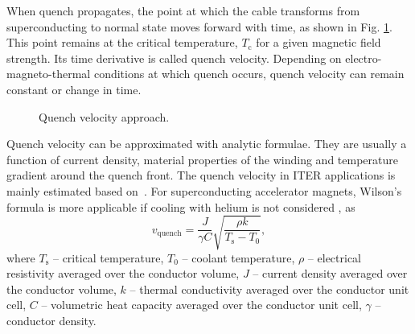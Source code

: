 
When quench propagates, the point at which the cable transforms from superconducting to normal state moves forward with time, as shown in Fig. \ref{fig:quench_front_propagation_illustration}. This point remains at the critical temperature, $T_\text{c}$ for a given magnetic field strength. Its time derivative is called quench velocity. Depending on electro-magneto-thermal conditions at which quench occurs, quench velocity can remain constant or change in time. 

\begin{figure}[H]
\centering
{}
\caption{Quench velocity approach.}
\label{fig:quench_front_propagation_illustration}
\end{figure}

Quench velocity can be approximated with analytic formulae. They are usually a function of current density, material properties of the winding and temperature gradient around the quench front. The quench velocity in ITER applications is mainly estimated based on~\cite{MIT_phd_thesis}. For superconducting accelerator magnets, Wilson's formula is more applicable if cooling with helium is not considered \cite[p.~206]{wilson1987superconducting}, as
\begin{equation}
    v_\text{quench}=\frac{J}{\gamma C}\sqrt{\frac{\rho k}{T_\text{s}-T_\text{0}}},
    \label{eqn:Wilson_quench_velocity_formula}
\end{equation}
where $T_\text{s}$ -- critical temperature,
$T_\text{0}$ -- coolant temperature,
$\rho$ -- electrical resistivity averaged over the conductor volume,
$J$ -- current density averaged over the conductor volume,
$k$ -- thermal conductivity averaged over the conductor unit cell,
$C$ -- volumetric heat capacity averaged over the conductor unit cell,
$\gamma$ -- conductor density.

